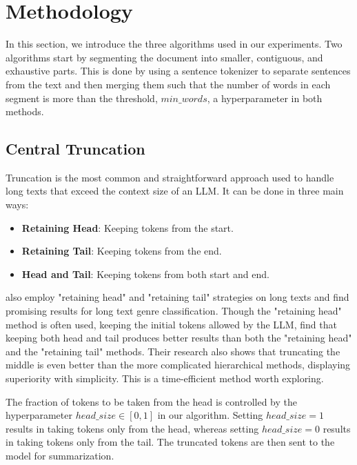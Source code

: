 \section{Methodology}
\label{sec:methodology}

In this section, we introduce the three algorithms used in our experiments.
Two algorithms start by segmenting the document into smaller, contiguous, and exhaustive parts.
This is done by using a sentence tokenizer to separate sentences from the text and then merging them such that the number of words in each segment is more than the threshold, $min\_words$, a hyperparameter in both methods.


\subsection{Central Truncation}
\label{method:truncation}

Truncation is the most common and straightforward approach used to handle long texts that exceed the context size of an LLM.
It can be done in three main ways:

\begin{itemize}
  \item \textbf{Retaining Head}: Keeping tokens from the start.
  \item \textbf{Retaining Tail}: Keeping tokens from the end.
  \item \textbf{Head and Tail}: Keeping tokens from both start and end.
\end{itemize}

\citet{worsham-kalita-2018-genre} also employ "retaining head" and "retaining tail" strategies on long texts and find promising results for long text genre classification.
Though the "retaining head" method is often used, keeping the initial tokens allowed by the LLM, \citet{sun2019fine} find that keeping both head and tail produces better results than both the "retaining head" and the "retaining tail" methods.
Their research also shows that truncating the middle is even better than the more complicated hierarchical methods, displaying superiority with simplicity.
This is a time-efficient method worth exploring.

The fraction of tokens to be taken from the head is controlled by the hyperparameter $head\_size \in [0, 1]$ in our algorithm.
Setting $head\_size = 1$ results in taking tokens only from the head, whereas setting $head\_size = 0$ results in taking tokens only from the tail.
The truncated tokens are then sent to the model for summarization.


